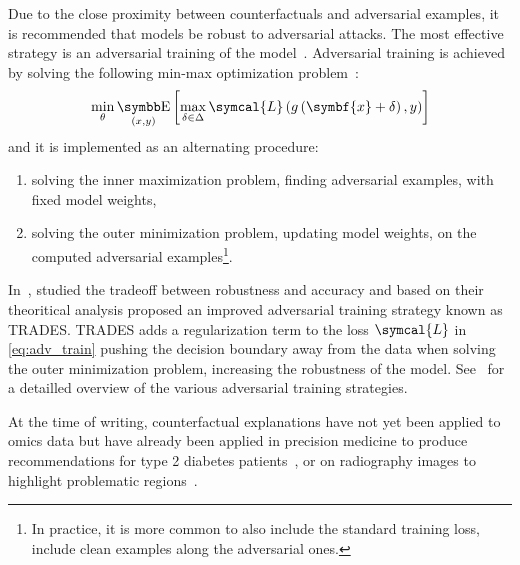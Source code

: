 \documentclass[../main.tex]{subfiles}
\begin{document}
	Due to the close proximity between counterfactuals and adversarial examples, it is recommended that models be robust to adversarial attacks.
	The most effective strategy is an adversarial training of the model~\cite{huang2016learningstrongadversary}.
	Adversarial training is achieved by solving the following min-max optimization problem~\cite{AdvTrainingMinMax}:
	\begin{equation}
	  \min_{\theta} \E_{(x,y)}\left[\max_{\delta \in \Delta} \symcal{L}\left(g\left(\symbf{x}+\delta\right), y \right)  \right] \label{eq:adv_train}
	\end{equation}
	and it is implemented as an alternating procedure:
	\begin{enumerate}[nosep]
	  \item solving the inner maximization problem, \ie{}finding adversarial examples, with fixed model weights,
	  \item solving the outer minimization problem, \ie{}updating model weights, on the computed adversarial examples\footnote{In practice, it is more common to also include the standard training loss, \ie{}include clean examples along the adversarial ones.}.
	\end{enumerate}
	In~\cite{TRADES}, \citeauthor{TRADES} studied the tradeoff between robustness and accuracy and based on their theoritical analysis proposed an improved adversarial training strategy known as TRADES.
	TRADES adds a regularization term to the loss \(\symcal{L}\) in \cref{eq:adv_train} pushing the decision boundary away from the data when solving the outer minimization problem, \ie{}increasing the robustness of the model.
	See~\cite{AdvTrainSurvey} for a detailled overview of the various adversarial training strategies.

	At the time of writing, counterfactual explanations have not yet been applied to omics data but have already been applied in precision medicine to produce recommendations for type 2 diabetes patients~\cite{Lenatti2022}, or on radiography images to highlight problematic regions~\cite{Thiagarajan2022,Mertes2022}.

\end{document}
